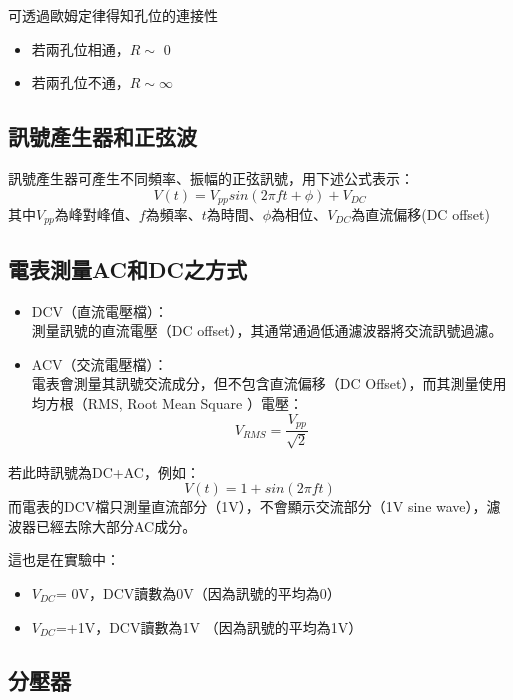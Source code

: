 \documentclass[12pt,a4paper]{article}
\begin{document}
\begin{CJK}{UTF8}{bkai}
可透過歐姆定律得知孔位的連接性
\begin{itemize}
    \item 若兩孔位相通，$R \sim$ 0
    \item 若兩孔位不通，$R \sim\infty$
\end{itemize}

\subsection{訊號產生器和正弦波}\label{subsec:princ_2}
\hfill

訊號產生器可產生不同頻率、振幅的正弦訊號，用下述公式表示：
\begin{equation}
V(t)=V_{pp}sin(2\pi ft+\phi)+V_{DC}
\end{equation}
其中$V_{pp}$為峰對峰值、$f$為頻率、$t$為時間、$\phi$為相位、$V_{DC}$為直流偏移(DC offset)

\subsection{電表測量AC和DC之方式}
\hfill

\begin{itemize}
    \item DCV（直流電壓檔）：\\
    測量訊號的直流電壓（DC offset），其通常通過低通濾波器將交流訊號過濾。
    \item ACV（交流電壓檔）：\\
    電表會測量其訊號交流成分，但不包含直流偏移（DC Offset），而其測量使用均方根（RMS, Root Mean Square ）電壓：
    \begin{equation}
        V_{RMS}=\frac{V_{pp}}{\sqrt{2}}
    \end{equation}
\end{itemize}


若此時訊號為DC+AC，例如：
\begin{equation}
    V(t) = 1+sin(2\pi ft)
\end{equation}
而電表的DCV檔只測量直流部分（1V），不會顯示交流部分（1V sine wave），濾波器已經去除大部分AC成分。

這也是在實驗中：
\begin{itemize}
    \item $V_{DC}$= 0V，DCV讀數為0V（因為訊號的平均為0）
    \item $V_{DC}$=+1V，DCV讀數為1V （因為訊號的平均為1V）
\end{itemize}

\subsection{分壓器}
\hfill


\end{CJK}
\end{document}
